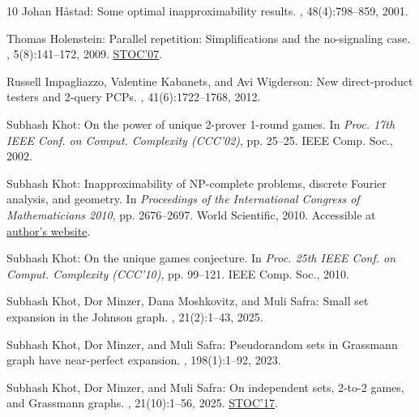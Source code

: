 \documentclass[11pt]{article}
\numberwithin{equation}{section}
\theoremstyle{definition}
\theoremstyle{plain}
\begin{document}
\begin{thebibliography}{10}
{\sc Johan H{\aa}stad}: Some optimal inapproximability results.
, 48(4):798--859, 2001.
\newblock [\epfmtdoi{10.1145/502090.502098}]

{\sc Thomas Holenstein}: Parallel repetition: Simplifications and the
  no-signaling case.
, 5(8):141--172, 2009.
\newblock \prelim \href{https://doi.org/10.1145/1250790.1250852}{STOC'07}.

{\sc Russell Impagliazzo, Valentine Kabanets, and Avi Wigderson}: New
  direct-product testers and 2-query {PCP}s.
, 41(6):1722--1768, 2012.
\newblock [\epfmtdoi{10.1137/09077299X}]

{\sc Subhash Khot}: On the power of unique 2-prover 1-round games.
\newblock In {\em Proc. 17th IEEE Conf. on Comput. Complexity (CCC'02)}, pp.
  25--25. IEEE Comp. Soc., 2002.

{\sc Subhash Khot}: Inapproximability of {NP}-complete problems, discrete
  {F}ourier analysis, and geometry.
\newblock In {\em Proceedings of the International Congress of Mathematicians
  2010}, pp. 2676--2697. World Scientific, 2010.
\newblock Accessible at
  \href{https://cs.nyu.edu/~khot/papers/icm-khot.pdf}{author's website}.
\newblock [\epfmtdoi{10.1142/9789814324359\_0163}]

{\sc Subhash Khot}: On the unique games conjecture.
\newblock In {\em Proc. 25th IEEE Conf. on Comput. Complexity (CCC'10)}, pp.
  99--121. IEEE Comp. Soc., 2010.

{\sc Subhash Khot, Dor Minzer, Dana Moshkovitz, and Muli Safra}: Small set
  expansion in the {J}ohnson graph.
, 21(2):1--43, 2025.

{\sc Subhash Khot, Dor Minzer, and Muli Safra}: Pseudorandom sets in
  {G}rassmann graph have near-perfect expansion.
, 198(1):1--92, 2023.

{\sc Subhash Khot, Dor Minzer, and Muli Safra}: On independent sets, 2-to-2
  games, and {G}rassmann graphs.
, 21(10):1--56, 2025.
\newblock \prelim \href{https://doi.org/10.1145/3055399.3055432}{STOC'17}.


\end{thebibliography}
\end{document}
